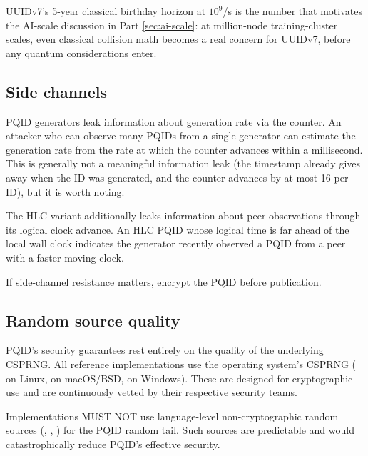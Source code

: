 UUIDv7's 5-year classical birthday horizon at $10^9$/s is the number that motivates the AI-scale discussion in Part \ref{sec:ai-scale}: at million-node training-cluster scales, even classical collision math becomes a real concern for UUIDv7, before any quantum considerations enter.

\subsection{Side channels}

PQID generators leak information about generation rate via the counter. An attacker who can observe many PQIDs from a single generator can estimate the generation rate from the rate at which the counter advances within a millisecond. This is generally not a meaningful information leak (the timestamp already gives away when the ID was generated, and the counter advances by at most 16 per ID), but it is worth noting.

The HLC variant additionally leaks information about peer observations through its logical clock advance. An HLC PQID whose logical time is far ahead of the local wall clock indicates the generator recently observed a PQID from a peer with a faster-moving clock.

If side-channel resistance matters, encrypt the PQID before publication.

\subsection{Random source quality}

PQID's security guarantees rest entirely on the quality of the underlying CSPRNG. All reference implementations use the operating system's CSPRNG ( on Linux,  on macOS/BSD,  on Windows). These are designed for cryptographic use and are continuously vetted by their respective security teams.

Implementations MUST NOT use language-level non-cryptographic random sources (, , ) for the PQID random tail. Such sources are predictable and would catastrophically reduce PQID's effective security.

